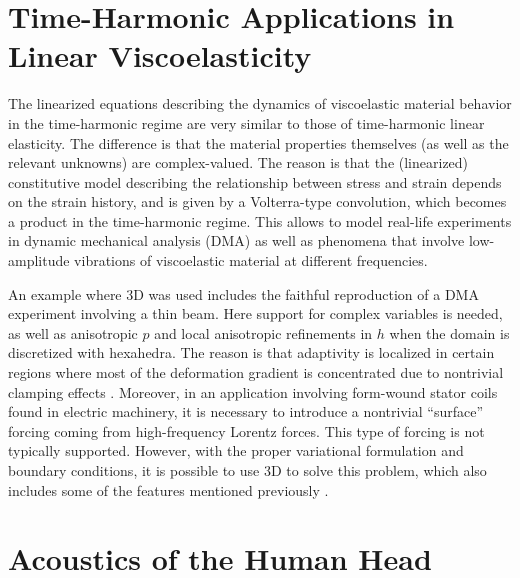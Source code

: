 \section{Time-Harmonic Applications in Linear Viscoelasticity}
\label{sec:visco-elasticity}

The linearized equations describing the dynamics of viscoelastic material behavior in the time-harmonic regime are very similar to those of time-harmonic linear elasticity. The difference is that the material properties themselves (as well as the relevant unknowns) are complex-valued. The reason is that the (linearized) constitutive model describing the relationship between stress and strain depends on the strain history, and is given by a Volterra-type convolution, which becomes a product in the time-harmonic regime. This allows to model real-life experiments in dynamic mechanical analysis (DMA) as well as phenomena that involve low-amplitude vibrations of viscoelastic material at different frequencies.

An example where \hp3D was used includes the faithful reproduction of a DMA experiment involving a thin beam. Here support for complex variables is needed, as well as anisotropic $p$ and local anisotropic refinements in $h$ when the domain is discretized with hexahedra. The reason is that adaptivity is localized in certain regions where most of the deformation gradient is concentrated due to nontrivial clamping effects \cite{fuentes2017viscoelasticity}. Moreover, in an application involving form-wound stator coils found in electric machinery, it is necessary to introduce a nontrivial ``surface'' forcing coming from high-frequency Lorentz forces. This type of forcing is not typically supported. However, with the proper variational formulation and boundary conditions, it is possible to use \hp3D to solve this problem, which also includes some of the features mentioned previously \cite{fuentes2018phd}.

\section{Acoustics of the Human Head}
\label{sec:human-head}


